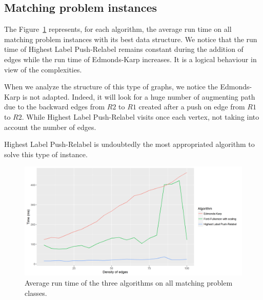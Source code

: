 \subsection{Matching problem instances}
The Figure~\ref{fig:meanmatchingproblem} represents, for each algorithm, the average run time on all matching problem instances with its best data structure. We notice that the run time of Highest Label Push-Relabel remains constant during the addition of edges while the run time of Edmonds-Karp increases. It is a logical behaviour in view of the complexities.

When we analyze the structure of this type of graphs, we notice the Edmonds-Karp is not adapted. Indeed, it will look for a huge number of augmenting path due to the backward edges from $R2$ to $R1$ created after a push on edge from $R1$ to $R2$. While Highest Label Push-Relabel visits once each vertex, not taking into account the number of edges.

Highest Label Push-Relabel is undoubtedly the most appropriated algorithm to solve this type of instance. 

\begin{figure}[H]
\begin{center}
\includegraphics[scale=0.6]{images/meanmatching.png}
\caption{Average run time of the three algorithms on all matching problem classes.}
\label{fig:meanmatchingproblem}
\end{center}
\end{figure}
